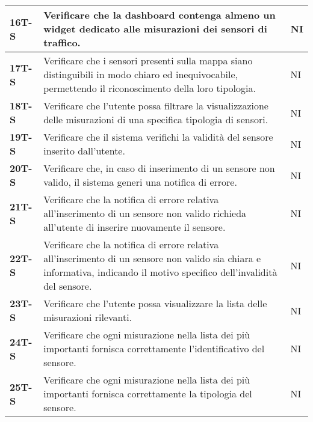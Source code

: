 \begin{longtable}{|>{\raggedright\arraybackslash}m{}|>{\raggedright\arraybackslash}m{}|>{\raggedright\arraybackslash}m{}|}
	\hline
	\textbf{16T-S}  & Verificare che la dashboard contenga almeno un widget dedicato alle misurazioni dei sensori di traffico.                                                                           & NI             \\
	\hline
	\textbf{17T-S}  & Verificare che i sensori presenti sulla mappa siano distinguibili in modo chiaro ed inequivocabile, permettendo il riconoscimento della loro tipologia.                            & NI             \\
	\hline
	\textbf{18T-S}  & Verificare che l’utente possa filtrare la visualizzazione delle misurazioni di una specifica tipologia di sensori.                                                                 & NI             \\
	\hline
	\textbf{19T-S}  & Verificare che il sistema verifichi la validità del sensore inserito dall’utente.                                                                                                  & NI             \\
	\hline
	\textbf{20T-S}  & Verificare che, in caso di inserimento di un sensore non valido, il sistema generi una notifica di errore.                                                                         & NI             \\
	\hline
	\textbf{21T-S}  & Verificare che la notifica di errore relativa all’inserimento di un sensore non valido richieda all’utente di inserire nuovamente il sensore.                                      & NI             \\
	\hline
	\textbf{22T-S}  & Verificare che la notifica di errore relativa all’inserimento di un sensore non valido sia chiara e informativa, indicando il motivo specifico dell’invalidità del sensore.        & NI             \\
	\hline
	\textbf{23T-S}  & Verificare che l’utente possa visualizzare la lista delle misurazioni rilevanti.                                                                                                   & NI             \\
	\hline
	\textbf{24T-S}  & Verificare che ogni misurazione nella lista dei più importanti fornisca correttamente l’identificativo del sensore.                                                                & NI             \\
	\hline
	\textbf{25T-S}  & Verificare che ogni misurazione nella lista dei più importanti fornisca correttamente la tipologia del sensore.                                                                    & NI             \\

\end{longtable}
